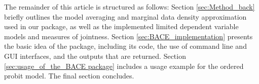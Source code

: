 The remainder of this article is structured as follows: Section
\ref{sec:Method_back} briefly outlines the model averaging and
marginal data density approximation used in our package, as
well as the implemented limited dependent variable models and
measures of jointness. Section \ref{sec:BACE_implementation}
presents the basic idea of the  package, including
its code, the use of command line and GUI interfaces, and the
outputs that are returned. Section \ref{sec:usage_of_the_BACE package}
includes a usage example for the ordered probit model.
The final section concludes.

